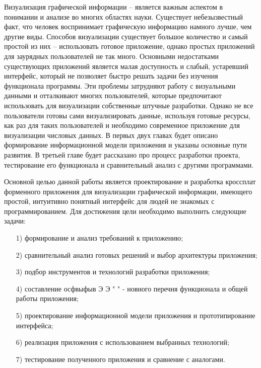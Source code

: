 \intro
Визуализация графической информации -- является важным аспектом в понимании и анализе во многих областях науки. Существует небезызвестный факт, что человек воспринимает графическую информацию намного лучше, чем другие виды. Способов визуализации существует большое количество и самый простой из них -- использовать готовое приложение, однако простых приложений для заурядных пользователей не так много. Основными недостатками существующих приложений является малая доступность и слабый, устаревший интерфейс, который не позволяет быстро решать задачи без изучения функционала программы. Эти проблемы затрудняют работу с визуальными данными и отталкивают многих пользователей, которые предпочитают использовать для визуализации собственные штучные разработки. Однако не все пользователи готовы сами визуализировать данные, используя готовые ресурсы, как раз для таких пользователей и необходимо современное приложение для визуализации числовых данных. В первых двух главах будет описано формирование информационной модели приложения и указаны основные пути развития. В третьей главе будет рассказано про процесс разработки проекта, тестирование его функционала и сравнительный анализ с другими программами.

Основной целью данной работы является проектирование и разработка кроссплат форменного приложения для визуализации графической информации, имеющего простой, интуитивно понятный интерфейс для людей не знакомых с программированием.
Для достижения цели необходимо выполнить следующие задачи:
\begin{enumerate} 
    \item [1)] формирование и анализ требований к приложению;
    \item [2)] сравнительный анализ готовых решений и выбор архитектуры приложения;
    \item [3)] подбор инструментов и технологий разработки приложения;
    \item [4)] составление осфвыфыв Э Э " " - новного перечня функционала и общей работы приложения;
    \item [5)] проектирование информационной модели приложения и прототипирование интерфейса;
    \item [6)] реализация приложения с использованием выбранных технологий;
    \item [7)] тестирование полученного приложения и сравнение с аналогами.
\end{enumerate}





